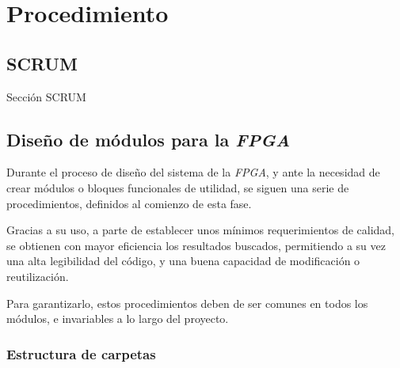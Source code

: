 \chapter{Procedimiento}
\label{ch:procedimiento}


\section{SCRUM}
Sección SCRUM

\section{Diseño de módulos para la \emph{FPGA}}

Durante el proceso de diseño del sistema de la \emph{FPGA}, y ante la necesidad de crear módulos o bloques funcionales de utilidad, se siguen una serie de procedimientos, definidos al comienzo de esta fase.

Gracias a su uso, a parte de establecer unos mínimos requerimientos de calidad, se obtienen con mayor eficiencia los resultados buscados, permitiendo a su vez una alta legibilidad del código, y una buena capacidad de modificación o reutilización.

Para garantizarlo, estos procedimientos deben de ser comunes en todos los módulos, e invariables a lo largo del proyecto.

\subsection{Estructura de carpetas}

